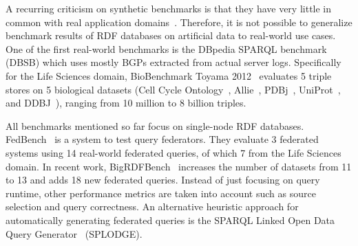 A recurring criticism on synthetic benchmarks is that they have very little in common with real application domains~\cite{DBLP:conf/sigmod/DuanKSU11}. Therefore, it is not possible to generalize benchmark results of RDF databases on artificial data to real-world use cases.
%
One of the first real-world benchmarks is the DBpedia SPARQL benchmark~\cite{morsey2011dbpedia} (DBSB) which uses mostly BGPs extracted from actual server logs.
Specifically for the Life Sciences domain, BioBenchmark Toyama 2012~\cite{wu2014biobenchmark} evaluates 5 triple stores on 5 biological datasets (Cell Cycle Ontology~\cite{antezana2009cell}, Allie~\cite{yamamoto2011allie}, PDBj~\cite{kinjo2011protein}, UniProt~\cite{uniprot2014uniprot}, and DDBJ~\cite{tateno2002dna}), ranging from 10 million to 8 billion triples.

All benchmarks mentioned so far focus on single-node RDF databases. FedBench~\cite{Schmidt2011} is a system to test query federators. They evaluate 3 federated systems using 14 real-world federated queries, of which 7 from the Life Sciences domain. In recent work, BigRDFBench~\cite{Saleem} increases the number of datasets from 11 to 13 and adds 18 new federated queries. Instead of just focusing on query runtime, other performance metrics are taken into account such as source selection and query correctness. An alternative heuristic approach for automatically generating federated queries is the SPARQL Linked Open Data Query Generator~\cite{gorlitz2012splodge} (SPLODGE).

